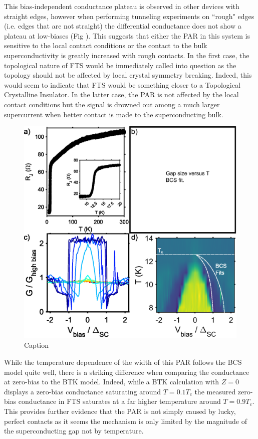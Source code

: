 This bias-independent conductance plateau is observed in other devices with straight edges, however when performing tunneling experiments on ``rough" edges (i.e. edges that are not straight) the differential conductance does not show a plateau at low-biases (Fig ). This suggests that either the \ac{PAR} in this system is sensitive to the local contact conditions or the contact to the bulk superconductivity is greatly increased with rough contacts. In the first case, the topological nature of \ac{FTS} would be immediately called into question as the topology should not be affected by local crystal symmetry breaking. Indeed, this would seem to indicate that \ac{FTS} would be something closer to a Topological Crystalline Insulator. In the latter case, the \ac{PAR} is not affected by the local contact conditions but the signal is drowned out among a much larger supercurrent when better contact is made to the superconducting bulk.\par
\begin{figure}[h]
    \centering
    \includegraphics[width = \textwidth]{Chap4/Figures/Temperature.eps}
    \caption{Caption}
    \label{fig:PARTemp}
\end{figure}
While the temperature dependence of the width of this \ac{PAR} follows the \ac{BCS} model quite well, there is a striking difference when comparing the conductance at zero-bias to the \ac{BTK} model. Indeed, while a \ac{BTK} calculation with $Z=0$ displays a zero-bias conductance saturating around $T=0.1T_{c}$ the measured zero-bias conductance in \ac{FTS} saturates at a far higher temperature around $T = 0.9T_{c}$. This provides further evidence that the \ac{PAR} is not simply caused by lucky, perfect contacts as it seems the mechanism is only limited by the magnitude of the superconducting gap not by temperature.  

